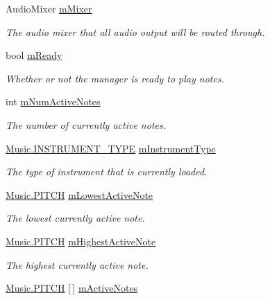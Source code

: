 \begin{DoxyCompactItemize}
Audio\+Mixer \hyperlink{group___v_i_m_priv_ga08c8db1bb89f4ab1e28451dd93d6b99c}{m\+Mixer}
\begin{DoxyCompactList}\small\item\em The audio mixer that all audio output will be routed through. \end{DoxyCompactList}\item 
bool \hyperlink{group___v_i_m_priv_ga983a11920bf16794735cc193c327ac42}{m\+Ready}
\begin{DoxyCompactList}\small\item\em Whether or not the manager is ready to play notes. \end{DoxyCompactList}\item 
int \hyperlink{group___v_i_m_priv_ga0f7e11945763c48057be326b661dfdaf}{m\+Num\+Active\+Notes}
\begin{DoxyCompactList}\small\item\em The number of currently active notes. \end{DoxyCompactList}\item 
\hyperlink{group___music_enums_gabfce60192305965558a36e368ebd67c3}{Music.\+I\+N\+S\+T\+R\+U\+M\+E\+N\+T\+\_\+\+T\+Y\+PE} \hyperlink{group___v_i_m_priv_ga108c350257b3a2080e06cd4a8251f6a4}{m\+Instrument\+Type}
\begin{DoxyCompactList}\small\item\em The type of instrument that is currently loaded. \end{DoxyCompactList}\item 
\hyperlink{group___music_enums_ga508f69b199ea518f935486c990edac1d}{Music.\+P\+I\+T\+CH} \hyperlink{group___v_i_m_priv_ga5e3a5116e0dabb37e0ea21d73ac1567e}{m\+Lowest\+Active\+Note}
\begin{DoxyCompactList}\small\item\em The lowest currently active note. \end{DoxyCompactList}\item 
\hyperlink{group___music_enums_ga508f69b199ea518f935486c990edac1d}{Music.\+P\+I\+T\+CH} \hyperlink{group___v_i_m_priv_ga73a09a4e4f09c0e5b3871dc9ad6c757e}{m\+Highest\+Active\+Note}
\begin{DoxyCompactList}\small\item\em The highest currently active note. \end{DoxyCompactList}\item 
\hyperlink{group___music_enums_ga508f69b199ea518f935486c990edac1d}{Music.\+P\+I\+T\+CH} \mbox{[}$\,$\mbox{]} \hyperlink{group___v_i_m_priv_ga5cedf9995d59b416412677e6004b659c}{m\+Active\+Notes}

\end{DoxyCompactItemize}
